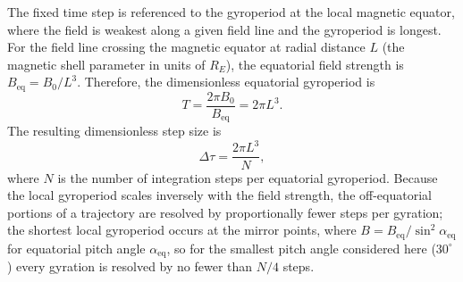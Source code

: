 \documentclass{article}
\begin{document}
The fixed time step is referenced to the gyroperiod at the local magnetic equator, where the field is weakest along a given field line and the gyroperiod is longest. For the field line crossing the magnetic equator at radial distance $L$ (the magnetic shell parameter in units of $R_E$), the equatorial field strength is $B_{\mathrm{eq}} = B_0/L^3$. Therefore, the dimensionless equatorial gyroperiod is
        \begin{equation*}
            T = \frac{2\pi B_0}{B_{\mathrm{eq}}} = 2\pi L^3.
        \end{equation*}
The resulting dimensionless step size is
        \begin{equation}
            \Delta \tau = \frac{2\pi L^3}{N},
            \label{eqn: dipole tau}
        \end{equation}
where $N$ is the number of integration steps per equatorial gyroperiod. Because the local gyroperiod scales inversely with the field strength, the off-equatorial portions of a trajectory are resolved by proportionally fewer steps per gyration; the shortest local gyroperiod occurs at the mirror points, where $B = B_{\mathrm{eq}}/\sin^2\alpha_{\mathrm{eq}}$ for equatorial pitch angle $\alpha_{\mathrm{eq}}$, so for the smallest pitch angle considered here ($30^\circ$) every gyration is resolved by no fewer than $N/4$ steps.
\end{document}

